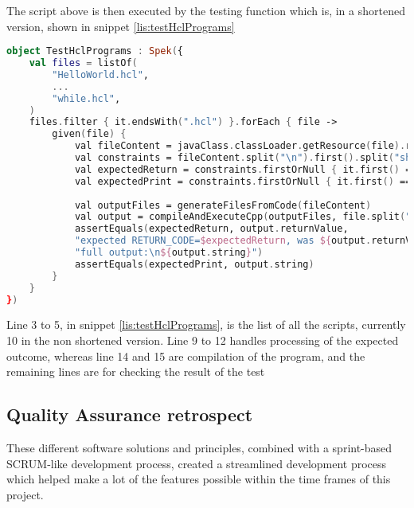 The script above is then executed by the testing function which is, in a shortened version, shown in snippet \ref{lis:testHclPrograms}
\begin{lstlisting}[language=Kotlin,label={lis:testHclPrograms},caption={Shortened version of the test for system tests}]
object TestHclPrograms : Spek({
	val files = listOf(
		"HelloWorld.hcl",
		...
		"while.hcl",
	)
	files.filter { it.endsWith(".hcl") }.forEach { file ->
		given(file) {
			val fileContent = javaClass.classLoader.getResource(file).readText()
			val constraints = fileContent.split("\n").first().split("should 		").drop(1).map { it.split(" ") }
			val expectedReturn = constraints.firstOrNull { it.first() == "return" }?.get(1)?.toInt() ?: 0
			val expectedPrint = constraints.firstOrNull { it.first() == "print" }?.drop(1)?.joinToString(" ") ?: " "
			
			val outputFiles = generateFilesFromCode(fileContent)
			val output = compileAndExecuteCpp(outputFiles, file.split(".").first(), keepFiles)!!
			assertEquals(expectedReturn, output.returnValue,
			"expected RETURN_CODE=$expectedReturn, was ${output.returnValue}\n" +
			"full output:\n${output.string}")
			assertEquals(expectedPrint, output.string)	
		}
	}
})
\end{lstlisting}

Line 3 to 5, in snippet \ref{lis:testHclPrograms}, is the list of all the scripts, currently 10 in the non shortened version. 
Line 9 to 12 handles processing of the expected outcome, whereas line 14 and 15 are compilation of the program, and the remaining lines are for checking the result of the test

\subsection{Quality Assurance retrospect}

These different software solutions and principles, combined with a sprint-based SCRUM-like development process, created a streamlined development process which helped make a lot of the features possible within the time frames of this project.